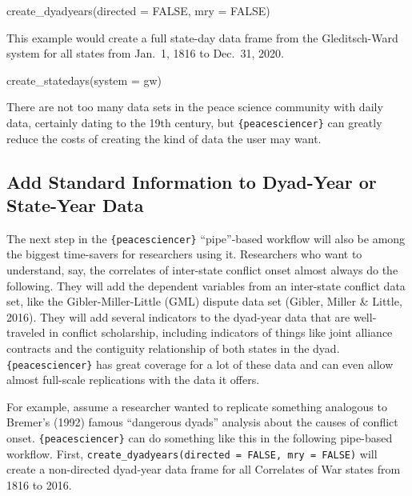 \documentclass[
  11pt,
]{article}
\newenvironment{Shaded}{\begin{snugshade}}{\end{snugshade}}
\newcommand{\AttributeTok}[1]{\textcolor[rgb]{0.77,0.63,0.00}{#1}}
\newcommand{\ConstantTok}[1]{\textcolor[rgb]{0.00,0.00,0.00}{#1}}
\newcommand{\FunctionTok}[1]{\textcolor[rgb]{0.00,0.00,0.00}{#1}}
\newcommand{\NormalTok}[1]{#1}
\newcommand{\StringTok}[1]{\textcolor[rgb]{0.31,0.60,0.02}{#1}}
\begin{document}
\begin{Shaded}
\begin{Highlighting}[]
\FunctionTok{create\_dyadyears}\NormalTok{(}\AttributeTok{directed =} \ConstantTok{FALSE}\NormalTok{, }\AttributeTok{mry =} \ConstantTok{FALSE}\NormalTok{)}
\end{Highlighting}
\end{Shaded}

This example would create a full state-day data frame from the Gleditsch-Ward system for all states from Jan.~1, 1816 to Dec.~31, 2020.

\begin{Shaded}
\begin{Highlighting}[]
\FunctionTok{create\_statedays}\NormalTok{(}\AttributeTok{system =} \StringTok{\textquotesingle{}gw\textquotesingle{}}\NormalTok{)}
\end{Highlighting}
\end{Shaded}

There are not too many data sets in the peace science community with daily data, certainly dating to the 19th century, but \texttt{\{peacesciencer\}} can greatly reduce the costs of creating the kind of data the user may want.

\hypertarget{add-standard-information-to-dyad-year-or-state-year-data}{%
\subsection{Add Standard Information to Dyad-Year or State-Year Data}\label{add-standard-information-to-dyad-year-or-state-year-data}}

The next step in the \texttt{\{peacesciencer\}} ``pipe''-based workflow will also be among the biggest time-savers for researchers using it. Researchers who want to understand, say, the correlates of inter-state conflict onset almost always do the following. They will add the dependent variables from an inter-state conflict data set, like the Gibler-Miller-Little (GML) dispute data set (Gibler, Miller \& Little, 2016). They will add several indicators to the dyad-year data that are well-traveled in conflict scholarship, including indicators of things like joint alliance contracts and the contiguity relationship of both states in the dyad. \texttt{\{peacesciencer\}} has great coverage for a lot of these data and can even allow almost full-scale replications with the data it offers.

For example, assume a researcher wanted to replicate something analogous to Bremer's (1992) famous ``dangerous dyads'' analysis about the causes of conflict onset. \texttt{\{peacesciencer\}} can do something like this in the following pipe-based workflow. First, \texttt{create\_dyadyears(directed\ =\ FALSE,\ mry\ =\ FALSE)} will create a non-directed dyad-year data frame for all Correlates of War states from 1816 to 2016.
\end{document}
